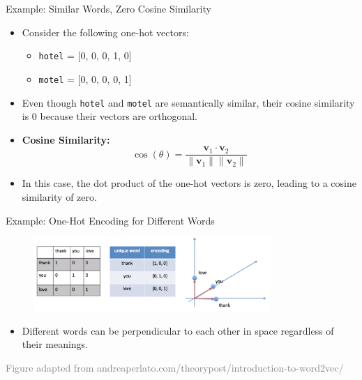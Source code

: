 \documentclass[serif, aspectratio=169]{beamer}
\begin{document}
\begin{frame}{Example: Similar Words, Zero Cosine Similarity}
	\begin{itemize}
		\item Consider the following one-hot vectors:
		\begin{itemize}
			\item \texttt{hotel} = [0, 0, 0, 1, 0]
			\item \texttt{motel} = [0, 0, 0, 0, 1]
		\end{itemize}
		\item Even though \texttt{hotel} and \texttt{motel} are semantically similar, their cosine similarity is 0 because their vectors are orthogonal.
		\item \textbf{Cosine Similarity:}
		\[
		\cos(\theta) = \frac{\mathbf{v}_1 \cdot \mathbf{v}_2}{\|\mathbf{v}_1\| \|\mathbf{v}_2\|}
		\]
		\item In this case, the dot product of the one-hot vectors is zero, leading to a cosine similarity of zero.
	\end{itemize}
\end{frame}

\begin{frame}{Example: One-Hot Encoding for Different Words}
	\begin{figure}
		\centering
		\includegraphics[width=0.8\textwidth]{pic/onehot encode_space.png}
	\end{figure}
	\begin{itemize}
		\item Different words can be perpendicular to each other in space regardless of their meanings.
	\end{itemize}
	\vspace{1.6cm}
	\hspace{-1.0cm}
	{\tiny \textcolor{gray}{Figure adapted from andreaperlato.com/theorypost/introduction-to-word2vec/}}
\end{frame}




\end{document}
